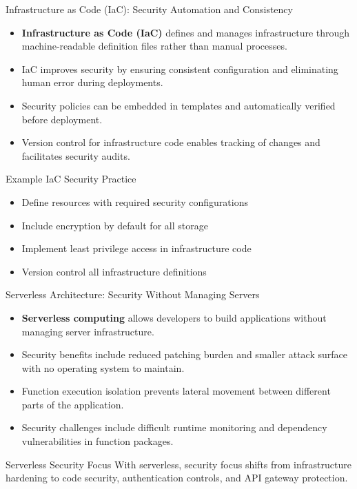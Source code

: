 \documentclass{beamer}
\begin{document}
\begin{frame}{Infrastructure as Code (IaC): Security Automation and Consistency}
\begin{itemize}
\item \textbf{Infrastructure as Code (IaC)} defines and manages infrastructure through machine-readable definition files rather than manual processes.
\item IaC improves security by ensuring consistent configuration and eliminating human error during deployments.
\item Security policies can be embedded in templates and automatically verified before deployment.
\item Version control for infrastructure code enables tracking of changes and facilitates security audits.
\end{itemize}

\begin{exampleblock}{Example IaC Security Practice}
\begin{itemize}
\item Define resources with required security configurations
\item Include encryption by default for all storage 
\item Implement least privilege access in infrastructure code
\item Version control all infrastructure definitions
\end{itemize}
\end{exampleblock}
\end{frame}

\begin{frame}{Serverless Architecture: Security Without Managing Servers}
\begin{itemize}
\item \textbf{Serverless computing} allows developers to build applications without managing server infrastructure.
\item Security benefits include reduced patching burden and smaller attack surface with no operating system to maintain.
\item Function execution isolation prevents lateral movement between different parts of the application.
\item Security challenges include difficult runtime monitoring and dependency vulnerabilities in function packages.
\end{itemize}

\begin{block}{Serverless Security Focus}
With serverless, security focus shifts from infrastructure hardening to code security, authentication controls, and API gateway protection.
\end{block}
\end{frame}
\end{document}

